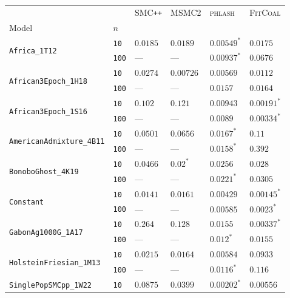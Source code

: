 \begin{footnotesize}
\begin{tabular}{llllll}
\toprule
 &  & \textsc{SMC}\texttt{{++}} & \textsc{MSMC2} & \textsc{phlash} & \textsc{FitCoal} \\
Model & $n$ &  &  &  &  \\
\midrule
\multirow[c]{2}{*}{\texttt{Africa\_1T12}} & \texttt{10} & $0.0185$ & $0.0189$ & $\mathbf{0.00549}^*$ & $0.0175$ \\
 & \texttt{100} & --- & --- & $\mathbf{0.00937}^*$ & $0.0676$ \\
\cline{1-6}
\multirow[c]{2}{*}{\texttt{African3Epoch\_1H18}} & \texttt{10} & $0.0274$ & $0.00726$ & $\mathbf{0.00569}$ & $0.0112$ \\
 & \texttt{100} & --- & --- & $\mathbf{0.0157}$ & $0.0164$ \\
\cline{1-6}
\multirow[c]{2}{*}{\texttt{African3Epoch\_1S16}} & \texttt{10} & $0.102$ & $0.121$ & $0.00943$ & $\mathbf{0.00191}^*$ \\
 & \texttt{100} & --- & --- & $0.0089$ & $\mathbf{0.00334}^*$ \\
\cline{1-6}
\multirow[c]{2}{*}{\texttt{AmericanAdmixture\_4B11}} & \texttt{10} & $0.0501$ & $0.0656$ & $\mathbf{0.0167}^*$ & $0.11$ \\
 & \texttt{100} & --- & --- & $\mathbf{0.0158}^*$ & $0.392$ \\
\cline{1-6}
\multirow[c]{2}{*}{\texttt{BonoboGhost\_4K19}} & \texttt{10} & $0.0466$ & $\mathbf{0.02}^*$ & $0.0256$ & $0.028$ \\
 & \texttt{100} & --- & --- & $\mathbf{0.0221}^*$ & $0.0305$ \\
\cline{1-6}
\multirow[c]{2}{*}{\texttt{Constant}} & \texttt{10} & $0.0141$ & $0.0161$ & $0.00429$ & $\mathbf{0.00145}^*$ \\
 & \texttt{100} & --- & --- & $0.00585$ & $\mathbf{0.0023}^*$ \\
\cline{1-6}
\multirow[c]{2}{*}{\texttt{GabonAg1000G\_1A17}} & \texttt{10} & $0.264$ & $0.128$ & $0.0155$ & $\mathbf{0.00337}^*$ \\
 & \texttt{100} & --- & --- & $\mathbf{0.012}^*$ & $0.0155$ \\
\cline{1-6}
\multirow[c]{2}{*}{\texttt{HolsteinFriesian\_1M13}} & \texttt{10} & $0.0215$ & $0.0164$ & $\mathbf{0.00584}$ & $0.0933$ \\
 & \texttt{100} & --- & --- & $\mathbf{0.0116}^*$ & $0.116$ \\
\cline{1-6}
\multirow[c]{2}{*}{\texttt{SinglePopSMCpp\_1W22}} & \texttt{10} & $0.0875$ & $0.0399$ & $\mathbf{0.00202}^*$ & $0.00556$ \\

\end{tabular}
\end{footnotesize}

